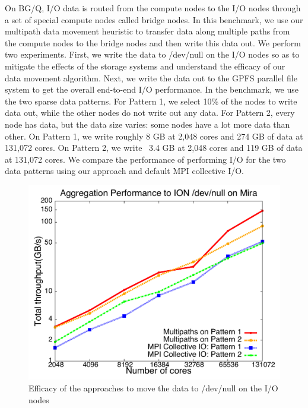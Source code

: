 \documentclass[final,5p,times]{elsarticle}
\begin{document}

On BG/Q, I/O data is routed from the compute nodes to the I/O nodes through a set of special compute nodes called bridge nodes. In this benchmark, we use our multipath data movement heuristic to transfer data along multiple paths from the compute nodes to the bridge nodes and then write this data out. We perform two experiments. First, we write the data to /dev/null on the I/O nodes so as to mitigate the effects of the storage systems and understand the efficacy of our data movement algorithm. Next, we write the data out to the GPFS parallel file system to get the overall end-to-end I/O performance. In the benchmark, we use the two sparse data patterns. For Pattern 1, we select 10\% of the nodes to write data out, while the other nodes do not write out any data. For Pattern 2, every node has data, but the data size varies: some nodes have a lot more data than other. On Pattern 1, we write roughly 8 GB at 2,048 cores and 274 GB of data at 131,072 cores. On Pattern 2, we write ~3.4 GB at 2,048 cores and 119 GB of data at 131,072 cores. We compare the performance of performing I/O for the two data patterns using our approach and default MPI collective I/O.

\begin{figure}[!htb]
\centering
\includegraphics[scale=0.3]{mira_agg.pdf}
\caption{Efficacy of the approaches to move the data to /dev/null on the I/O nodes}
\label{fig:mira_agg}
\end{figure}
\end{document}
